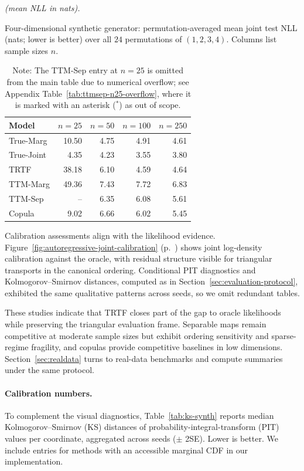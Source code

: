 \documentclass[11pt,a4paper,twoside]{book}\usepackage[]{graphicx}\usepackage[]{xcolor}
\begin{document}
\begin{table}[htbp]
  \centering
  \textit{(mean NLL in nats).}
  \caption{Four-dimensional synthetic generator: permutation-averaged mean joint test NLL (nats; lower is better) over all $24$ permutations of $(1,2,3,4)$. Columns list sample sizes $n$.}
  \label{tab:autoregressive-perm-avg}
  \begin{tabular}{lrrrr}
    \hline
    Model & $n=25$ & $n=50$ & $n=100$ & $n=250$ \\
    \hline
    True-Marg       & 10.50 & 4.75 & 4.91 & 4.61 \\
    True-Joint      & 4.35 & 4.23 & 3.55 & 3.80 \\
    TRTF              & 38.18 & 6.10 & 4.59 & 4.64 \\
    TTM-Marg          & 49.36 & 7.43 & 7.72 & 6.83 \\
    TTM-Sep           & -- & 6.35 & 6.08 & 5.61 \\
    Copula            & 9.02 & 6.66 & 6.02 & 5.45 \\
    \hline
  \end{tabular}
  \caption*{Note: The TTM-Sep entry at $n=25$ is omitted from the main table due to numerical overflow; see Appendix Table~\ref{tab:ttmsep-n25-overflow}, where it is marked with an asterisk ($^{\ast}$) as out of scope.}
\end{table}

Calibration assessments align with the likelihood evidence. Figure~\ref{fig:autoregressive-joint-calibration} (p.~\pageref{fig:autoregressive-joint-calibration}) shows joint log-density calibration against the oracle, with residual structure visible for triangular transports in the canonical ordering. Conditional PIT diagnostics and Kolmogorov--Smirnov distances, computed as in Section~\ref{sec:evaluation-protocol}, exhibited the same qualitative patterns across seeds, so we omit redundant tables.

These studies indicate that TRTF closes part of the gap to oracle likelihoods while preserving the triangular evaluation frame. Separable maps remain competitive at moderate sample sizes but exhibit ordering sensitivity and sparse-regime fragility, and copulas provide competitive baselines in low dimensions. Section~\ref{sec:realdata} turns to real-data benchmarks and compute summaries under the same protocol.

\paragraph{Calibration numbers.} To complement the visual diagnostics, Table~\ref{tab:ks-synth} reports median Kolmogorov--Smirnov (KS) distances of probability-integral-transform (PIT) values per coordinate, aggregated across seeds ($\pm$ 2SE). Lower is better. We include entries for methods with an accessible marginal CDF in our implementation.
\end{document}
